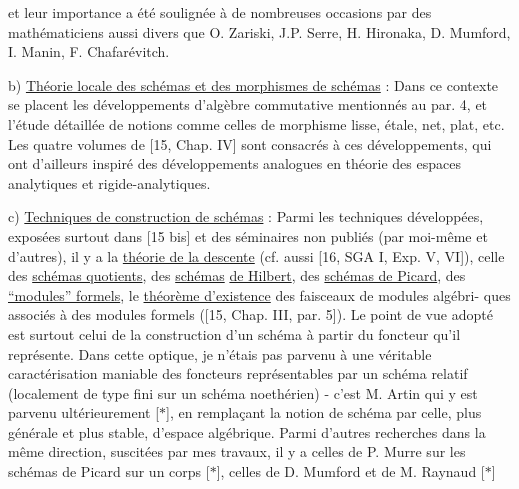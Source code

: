 
et leur importance a été soulignée à de nombreuses
occasions par des mathématiciens aussi divers que
O. Zariski, J.P. Serre, H. Hironaka, D. Mumford, I. Manin,
F. Chafarévitch.

b) \uline{Théorie locale des schémas et des morphismes de schémas} :
Dans ce contexte se placent les développements d'algèbre
commutative mentionnés au par. 4, et l'étude détaillée
de notions comme celles de morphisme lisse, étale,
net, plat, etc. Les quatre volumes de [15, Chap. IV]
sont consacrés à ces développements, qui ont d'ailleurs
inspiré des développements analogues en théorie des
espaces analytiques et rigide-analytiques.

c) \uline{Techniques de construction de schémas} : Parmi les
techniques développées, exposées surtout dans [15 bis]
et des séminaires non publiés (par moi-même et d'autres),
il y a la \uline{théorie de la descente} (cf. aussi [16, SGA I,
Exp. V, VI]), celle des \uline{schémas quotients}, des \uline{schémas}
\uline{de Hilbert}, des \uline{schémas de Picard}, des \uline{``modules'' formels},
le \uline{théorème d'existence} des faisceaux de modules algébri-%
ques associés à des modules formels ([15, Chap. III,
par. 5]). Le point de vue adopté est surtout celui de
la construction d'un schéma à partir du foncteur qu'il
représente. Dans cette optique, je n'étais pas parvenu
à une véritable caractérisation maniable des foncteurs
représentables par un schéma relatif (localement de type
fini sur un schéma noethérien) - c'est M. Artin qui y
est parvenu ultérieurement [$*$], en remplaçant la notion
de schéma par celle, plus générale et plus stable,
d'espace algébrique. Parmi d'autres recherches dans
la même direction, suscitées par mes travaux, il y a
celles de P. Murre sur les schémas de Picard sur un
corps [$*$], celles de D. Mumford et de M. Raynaud [$*$]

